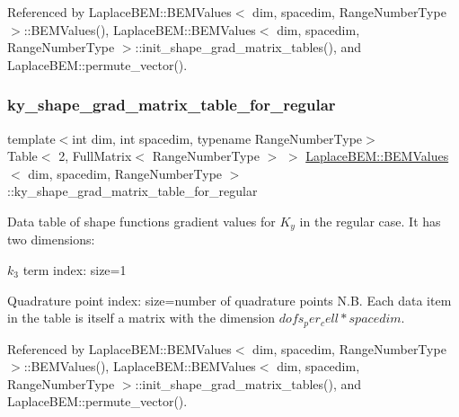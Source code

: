 Referenced by Laplace\+B\+E\+M\+::\+B\+E\+M\+Values$<$ dim, spacedim, Range\+Number\+Type $>$\+::\+B\+E\+M\+Values(), Laplace\+B\+E\+M\+::\+B\+E\+M\+Values$<$ dim, spacedim, Range\+Number\+Type $>$\+::init\+\_\+shape\+\_\+grad\+\_\+matrix\+\_\+tables(), and Laplace\+B\+E\+M\+::permute\+\_\+vector().

\mbox{\label{classLaplaceBEM_1_1BEMValues_a83e4f5a68a6f8f7c522ca3e441d0e681}} 
\subsubsection{\texorpdfstring{ky\+\_\+shape\+\_\+grad\+\_\+matrix\+\_\+table\+\_\+for\+\_\+regular}{ky\_shape\_grad\_matrix\_table\_for\_regular}}
{\footnotesize\ttfamily template$<$int dim, int spacedim, typename Range\+Number\+Type$>$ \\
Table$<$ 2, Full\+Matrix$<$ Range\+Number\+Type $>$ $>$ \hyperlink{classLaplaceBEM_1_1BEMValues}{Laplace\+B\+E\+M\+::\+B\+E\+M\+Values}$<$ dim, spacedim, Range\+Number\+Type $>$\+::ky\+\_\+shape\+\_\+grad\+\_\+matrix\+\_\+table\+\_\+for\+\_\+regular}

Data table of shape function\textquotesingle{}s gradient values for $K_y$ in the regular case. It has two dimensions\+:
\begin{DoxyEnumerate}
\item $k_3$ term index\+: size=1
\item Quadrature point index\+: size=number of quadrature points N.\+B. Each data item in the table is itself a matrix with the dimension $dofs_per_cell*spacedim$. 
\end{DoxyEnumerate}

Referenced by Laplace\+B\+E\+M\+::\+B\+E\+M\+Values$<$ dim, spacedim, Range\+Number\+Type $>$\+::\+B\+E\+M\+Values(), Laplace\+B\+E\+M\+::\+B\+E\+M\+Values$<$ dim, spacedim, Range\+Number\+Type $>$\+::init\+\_\+shape\+\_\+grad\+\_\+matrix\+\_\+tables(), and Laplace\+B\+E\+M\+::permute\+\_\+vector().

\mbox{\label{classLaplaceBEM_1_1BEMValues_ab42688bec1d85d6f09f45d419839278f}} 
